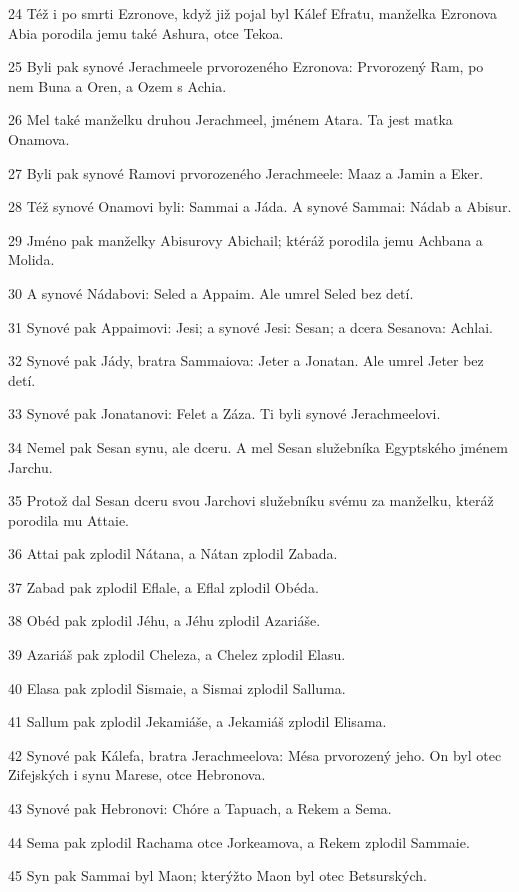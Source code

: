 \par 24 Též i po smrti Ezronove, když již pojal byl Kálef Efratu, manželka Ezronova Abia porodila jemu také Ashura, otce Tekoa.
\par 25 Byli pak synové Jerachmeele prvorozeného Ezronova: Prvorozený Ram, po nem Buna a Oren, a Ozem s Achia.
\par 26 Mel také manželku druhou Jerachmeel, jménem Atara. Ta jest matka Onamova.
\par 27 Byli pak synové Ramovi prvorozeného Jerachmeele: Maaz a Jamin a Eker.
\par 28 Též synové Onamovi byli: Sammai a Jáda. A synové Sammai: Nádab a Abisur.
\par 29 Jméno pak manželky Abisurovy Abichail; ktéráž porodila jemu Achbana a Molida.
\par 30 A synové Nádabovi: Seled a Appaim. Ale umrel Seled bez detí.
\par 31 Synové pak Appaimovi: Jesi; a synové Jesi: Sesan; a dcera Sesanova: Achlai.
\par 32 Synové pak Jády, bratra Sammaiova: Jeter a Jonatan. Ale umrel Jeter bez detí.
\par 33 Synové pak Jonatanovi: Felet a Záza. Ti byli synové Jerachmeelovi.
\par 34 Nemel pak Sesan synu, ale dceru. A mel Sesan služebníka Egyptského jménem Jarchu.
\par 35 Protož dal Sesan dceru svou Jarchovi služebníku svému za manželku, kteráž porodila mu Attaie.
\par 36 Attai pak zplodil Nátana, a Nátan zplodil Zabada.
\par 37 Zabad pak zplodil Eflale, a Eflal zplodil Obéda.
\par 38 Obéd pak zplodil Jéhu, a Jéhu zplodil Azariáše.
\par 39 Azariáš pak zplodil Cheleza, a Chelez zplodil Elasu.
\par 40 Elasa pak zplodil Sismaie, a Sismai zplodil Salluma.
\par 41 Sallum pak zplodil Jekamiáše, a Jekamiáš zplodil Elisama.
\par 42 Synové pak Kálefa, bratra Jerachmeelova: Mésa prvorozený jeho. On byl otec Zifejských i synu Marese, otce Hebronova.
\par 43 Synové pak Hebronovi: Chóre a Tapuach, a Rekem a Sema.
\par 44 Sema pak zplodil Rachama otce Jorkeamova, a Rekem zplodil Sammaie.
\par 45 Syn pak Sammai byl Maon; kterýžto Maon byl otec Betsurských.
